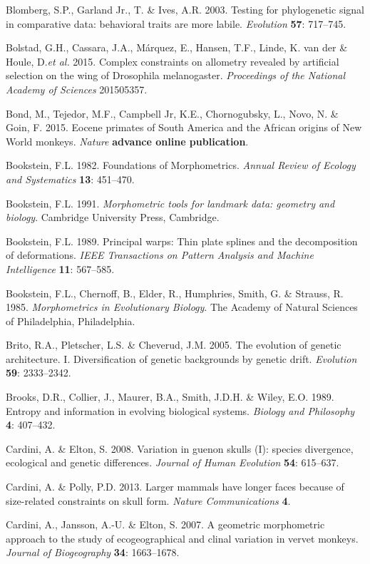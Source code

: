 \documentclass[12pt,twoside]{report}
\begin{document}
Blomberg, S.P., Garland Jr., T. \& Ives, A.R. 2003. Testing for
phylogenetic signal in comparative data: behavioral traits are more
labile. \emph{Evolution} \textbf{57}: 717--745.

Bolstad, G.H., Cassara, J.A., Márquez, E., Hansen, T.F., Linde, K. van
der \& Houle, D.\emph{et al.} 2015. Complex constraints on allometry
revealed by artificial selection on the wing of Drosophila melanogaster.
\emph{Proceedings of the National Academy of Sciences} 201505357.

Bond, M., Tejedor, M.F., Campbell Jr, K.E., Chornogubsky, L., Novo, N.
\& Goin, F. 2015. Eocene primates of South America and the African
origins of New World monkeys. \emph{Nature} \textbf{advance online
publication}.

Bookstein, F.L. 1982. Foundations of Morphometrics. \emph{Annual Review
of Ecology and Systematics} \textbf{13}: 451--470.

Bookstein, F.L. 1991. \emph{Morphometric tools for landmark data:
geometry and biology}. Cambridge University Press, Cambridge.

Bookstein, F.L. 1989. Principal warps: Thin plate splines and the
decomposition of deformations. \emph{IEEE Transactions on Pattern
Analysis and Machine Intelligence} \textbf{11}: 567--585.

Bookstein, F.L., Chernoff, B., Elder, R., Humphries, Smith, G. \&
Strauss, R. 1985. \emph{Morphometrics in Evolutionary Biology}. The
Academy of Natural Sciences of Philadelphia, Philadelphia.

Brito, R.A., Pletscher, L.S. \& Cheverud, J.M. 2005. The evolution of
genetic architecture. I. Diversification of genetic backgrounds by
genetic drift. \emph{Evolution} \textbf{59}: 2333--2342.

Brooks, D.R., Collier, J., Maurer, B.A., Smith, J.D.H. \& Wiley, E.O.
1989. Entropy and information in evolving biological systems.
\emph{Biology and Philosophy} \textbf{4}: 407--432.

Cardini, A. \& Elton, S. 2008. Variation in guenon skulls (I): species
divergence, ecological and genetic differences. \emph{Journal of Human
Evolution} \textbf{54}: 615--637.

Cardini, A. \& Polly, P.D. 2013. Larger mammals have longer faces
because of size-related constraints on skull form. \emph{Nature
Communications} \textbf{4}.

Cardini, A., Jansson, A.-U. \& Elton, S. 2007. A geometric morphometric
approach to the study of ecogeographical and clinal variation in vervet
monkeys. \emph{Journal of Biogeography} \textbf{34}: 1663--1678.
\end{document}
